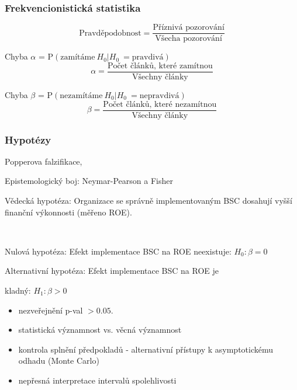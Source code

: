 \documentclass[10pt,xcolor={dvipsnames}]{beamer}
\begin{document}
\begin{frame}[fragile]
\frametitle{Frekvencionistická statistika}
\begin{large}
\[\text{Pravděpodobnost} = \frac{\text{Příznivá pozorování}}{\text{Všecha pozorování}}\]\bigskip

\textcolor{WildStrawberry}{Chyba $\alpha$ = $\text{P}\left(\text{zamítáme}\ H_0 | H_0\ =\text{pravdivá} \right)$\bigskip
\[\alpha = \frac{\text{Počet článků, které zamítnou}}{\text{Všechny články}}\]}

\textcolor{NavyBlue}{Chyba $\beta$ = $\text{P}\left(\text{nezamítáme}\ H_0 | H_0\ =\text{nepravdivá} \right)$\bigskip
\[\beta = \frac{\text{Počet článků, které nezamítnou}}{\text{Všechny články}}\]}

\end{large}
\end{frame}


\begin{frame}
\frametitle{Hypotézy}
\begin{large}
\begin{itemize}
\item[--] Popperova falzifikace,
\item[--] Epistemologický boj: Neymar-Pearson a Fisher \\
\textcolor{WildStrawberry}{\item[--] Vědecká hypotéza: Organizace se správně implementovaným BSC dosahují vyšší finanční výkonnosti (měřeno ROE).}\\
\textcolor{NavyBlue}{\item[--] Nulová hypotéza: Efekt implementace BSC na ROE neexistuje: $H_0: \beta = 0$ } 
\textcolor{NavyBlue}{\item[--] Alternativní hypotéza: Efekt implementace BSC na ROE je }\textcolor{WildStrawberry}{kladný}\textcolor{NavyBlue}{: $H_1: \beta > 0$ } 
\end{itemize}
\end{large}
\end{frame}



\begin{frame}
\begin{large}

\begin{itemize}
\item[--] nezveřejnění p-val $>0.05$.
\item[--] statistická významnost vs. věcná významnost
\item[--] kontrola splnění předpokladů - alternativní přístupy k asymptotickému odhadu (Monte Carlo)
\item[--] nepřesná interpretace intervalů spolehlivosti
\end{itemize}
\end{large}
\end{frame}
\end{document}
